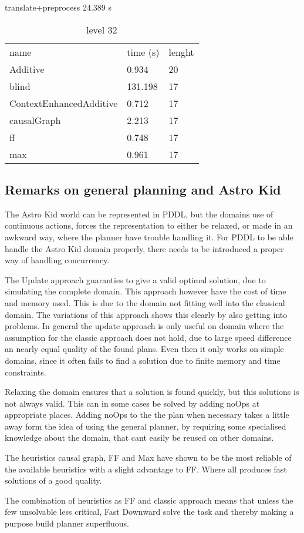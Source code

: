 	\begin{table}[h]
		\centering
		\caption{level 32}
		\label{tablvl32}
		translate+preprocess
		24.389 s\\
		\begin{tabular}{lll}
			
			name & time (s)& lenght\\
			Additive & 0.934 & 20\\
			blind & 131.198 & 17\\
			ContextEnhancedAdditive & 0.712 & 17\\
			causalGraph & 2.213 & 17\\
			ff & 0.748 & 17\\
			max & 0.961 & 17\\
		\end{tabular}
	\end{table}
\subsection{Remarks on general planning and Astro Kid}
	The Astro Kid world can be represented in PDDL, but the domains use of continuous actions, forces the representation to either be relaxed, or made in an awkward way, where the planner have trouble handling it. For PDDL to be able handle the Astro Kid domain properly, there needs to be introduced a proper way of handling concurrency.

	The Update approach guaranties to give a valid optimal solution, due to simulating the complete domain. This approach however have the cost of time and memory used. This is due to the domain not fitting well into the classical domain. The variations of this approach shows this clearly by also getting into problems. In general the update approach is only useful on domain where the assumption for the classic approach does not hold, due to large speed difference an nearly equal quality of the found plans. Even then it only works on simple domains, since it often fails to find a solution due to finite memory and time constraints.

	Relaxing the domain ensures that a solution is found quickly, but this solutions is not always valid. This can in some cases be solved by adding noOps at appropriate places. Adding noOps to the the plan when necessary takes a little away form the idea of using the general planner, by requiring some specialised knowledge about the domain, that cant easily be reused on other domains.
	
	The heuristics causal graph, FF and Max have shown to be the most reliable of the available heuristics with a slight advantage to FF. Where all produces fast solutions of a good quality. 
	
	The combination of heuristics as FF and classic approach means that unless the few unsolvable less critical, Fast Downward solve the task and thereby making a purpose build planner superfluous.